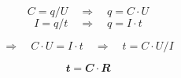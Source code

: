 \documentclass[varwidth]{standalone}
\begin{document}
\begin{minipage}{4.3cm}
$$C = q / U \quad \Rightarrow \quad q = C · U$$
$$I = q / t \quad \Rightarrow \quad q = I · t$$
\end{minipage}
\begin{minipage}{6.5cm}
\vspace{25pt}
$$\Rightarrow \quad C · U = I · t \quad \Rightarrow \quad t = C · U/I$$

\vspace{-9pt}
$$\mathbfit{t = C · R}$$
\end{minipage}
\end{document}
